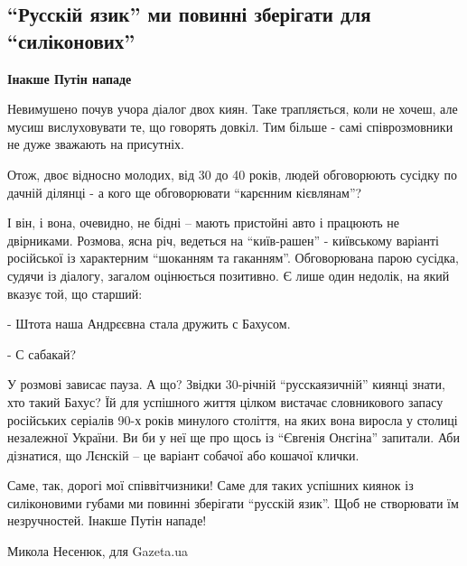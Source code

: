  
 
 
 
 

\subsection{\enquote{Русскій язик} ми повинні зберігати для \enquote{силіконових}}
\label{sec:20_11_2020.news.ua.gazeta.1.russki_jazyk_silikonovy}


\begin{leftbar}
	\bfseries
	Інакше Путін нападе
\end{leftbar}


Невимушено почув учора діалог двох киян. Таке трапляється, коли не хочеш, але
мусиш вислуховувати те, що говорять довкіл. Тим більше - самі співрозмовники не
дуже зважають на присутніх.

Отож, двоє відносно молодих, від 30 до 40 років, людей обговорюють сусідку по
дачній ділянці - а кого ще обговорювати \enquote{карєнним кієвлянам}?

І він, і вона, очевидно, не бідні – мають пристойні авто і працюють не
двірниками. Розмова, ясна річ, ведеться на \enquote{київ-рашен} - київському варіанті
російської із характерним \enquote{шоканням та гаканням}. Обговорювана парою сусідка,
судячи із діалогу, загалом оцінюється позитивно. Є лише один недолік, на який
вказує той, що старший:

- Штота наша Андрєєвна стала дружить с Бахусом.

- С сабакай?

У розмові зависає пауза. А що? Звідки 30-річній \enquote{русскаязичній} киянці знати,
хто такий Бахус? Їй для успішного життя цілком вистачає словникового запасу
російських серіалів 90-х років минулого століття, на яких вона виросла у
столиці незалежної України. Ви би у неї ще про щось із \enquote{Євгенія Онєгіна}
запитали. Аби дізнатися, що Лєнскій – це варіант собачої або кошачої клички.

Саме, так, дорогі мої співвітчизники! Саме для таких успішних киянок із
силіконовими губами ми повинні зберігати \enquote{русскій язик}. Щоб не створювати їм
незручностей. Інакше Путін нападе!

Микола Несенюк, для Gazeta.ua

